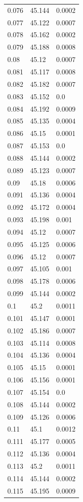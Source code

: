 \begin{table}[H]
\begin{tabular}{lll}
0.076 & 45.144 & 0.0002 \\
0.077 & 45.122 & 0.0007 \\
0.078 & 45.162 & 0.0002 \\
0.079 & 45.188 & 0.0008 \\
0.08 & 45.12 & 0.0007 \\
0.081 & 45.117 & 0.0008 \\
0.082 & 45.182 & 0.0007 \\
0.083 & 45.152 & 0.0 \\
0.084 & 45.192 & 0.0009 \\
0.085 & 45.135 & 0.0004 \\
0.086 & 45.15 & 0.0001 \\
0.087 & 45.153 & 0.0 \\
0.088 & 45.144 & 0.0002 \\
0.089 & 45.123 & 0.0007 \\
0.09 & 45.18 & 0.0006 \\
0.091 & 45.136 & 0.0004 \\
0.092 & 45.172 & 0.0004 \\
0.093 & 45.198 & 0.001 \\
0.094 & 45.12 & 0.0007 \\
0.095 & 45.125 & 0.0006 \\
0.096 & 45.12 & 0.0007 \\
0.097 & 45.105 & 0.001 \\
0.098 & 45.178 & 0.0006 \\
0.099 & 45.144 & 0.0002 \\
0.1 & 45.2 & 0.0011 \\
0.101 & 45.147 & 0.0001 \\
0.102 & 45.186 & 0.0007 \\
0.103 & 45.114 & 0.0008 \\
0.104 & 45.136 & 0.0004 \\
0.105 & 45.15 & 0.0001 \\
0.106 & 45.156 & 0.0001 \\
0.107 & 45.154 & 0.0 \\
0.108 & 45.144 & 0.0002 \\
0.109 & 45.126 & 0.0006 \\
0.11 & 45.1 & 0.0012 \\
0.111 & 45.177 & 0.0005 \\
0.112 & 45.136 & 0.0004 \\
0.113 & 45.2 & 0.0011 \\
0.114 & 45.144 & 0.0002 \\
0.115 & 45.195 & 0.0009 \\

\end{tabular}
\end{table}
